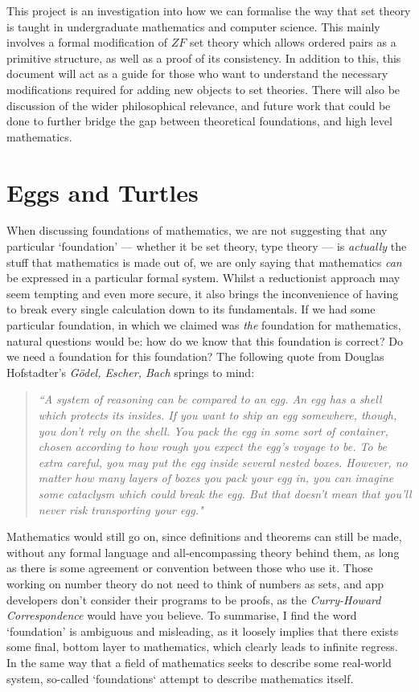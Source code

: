 \documentclass[11pt]{report}
\theoremstyle{definition}
\theoremstyle{theorem}
\theoremstyle{lemma}
\begin{document}
This project is an investigation into how we can formalise the way that set theory is taught in undergraduate mathematics and computer science.
This mainly involves a formal modification of $\mathit{ZF}$ set theory which allows ordered pairs as a primitive structure, as well as a proof of its consistency.
In addition to this, this document will act as a guide for those who want to understand the necessary modifications required for adding new objects to set theories. 
There will also be discussion of the wider philosophical relevance, and future work that could be done to further bridge the gap between theoretical foundations, and high level mathematics. 

\section{Eggs and Turtles}
When discussing foundations of mathematics, we are not suggesting that any particular `foundation' --- whether it be set theory, type theory --- is \emph{actually} the stuff that mathematics is made out of, we are only saying that mathematics \emph{can} be expressed in a particular formal system. 
Whilst a reductionist approach may seem tempting and even more secure, it also brings the inconvenience of having to break every single calculation down to its fundamentals.
If we had some particular foundation, in which we claimed was \emph{the} foundation for mathematics, natural questions would be: how do we know that this foundation is correct? Do we need a foundation for this foundation? 
The following quote from Douglas Hofstadter's \textit{G\"odel, Escher, Bach} springs to mind: 

\begin{quotation}
\begin{small}\textit{
``A system of reasoning can be compared to an egg. An egg has a shell
which protects its insides. If you want to ship an egg somewhere, though,
you don't rely on the shell. You pack the egg in some sort of container,
chosen according to how rough you expect the egg's voyage to be. To be
extra careful, you may put the egg inside several nested boxes. However,
no matter how many layers of boxes you pack your egg in, you can imagine
some cataclysm which could break the egg. But that doesn't mean that
you'll never risk transporting your egg."}\\
\end{small}
\end{quotation}
Mathematics would still go on, since definitions and theorems can still be made, without any formal language and all-encompassing theory behind them, as long as there is some agreement or convention between those who use it.
Those working on number theory do not need to think of numbers as sets, and app developers don't consider their programs to be proofs, as the \emph{Curry-Howard Correspondence} would have you believe. 
To summarise, I find the word `foundation' is ambiguous and misleading, as it loosely implies that there exists some final, bottom layer to mathematics, which clearly leads to infinite regress. 
In the same way that a field of mathematics seeks to describe some real-world system, so-called `foundations` attempt to describe mathematics itself.\\
\end{document}
